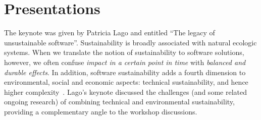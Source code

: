 \documentclass[11pt, oneside]{amsart}
\newcommand{\note}[1]{ {\textcolor{blueish}    { ***Note:      #1 }}}
\begin{document}





\section{Presentations}\label{sec:presentations}


The keynote was given by Patricia Lago and entitled ``The legacy of unsustainable software''.
%
Sustainability is broadly associated with natural ecologic systems. When we translate the notion of sustainability to software solutions, however, we often confuse {\em impact in a certain point in time} with {\em balanced and durable effects}. In addition, software sustainability adds a fourth dimension to environmental, social and economic aspects: technical sustainability, and hence higher complexity~\cite{Lago2015}.  Lago's keynote discussed the challenges (and some related ongoing research) of combining technical and environmental sustainability, providing a complementary angle to the workshop discussions.
\end{document}
